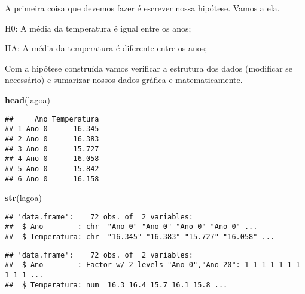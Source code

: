 \documentclass[]{book}
\newenvironment{Shaded}{\begin{snugshade}}{\end{snugshade}}
\newcommand{\KeywordTok}[1]{\textcolor[rgb]{0.13,0.29,0.53}{\textbf{#1}}}
\newcommand{\NormalTok}[1]{#1}
\newcommand{\OperatorTok}[1]{\textcolor[rgb]{0.81,0.36,0.00}{\textbf{#1}}}
\newcommand{\StringTok}[1]{\textcolor[rgb]{0.31,0.60,0.02}{#1}}
\begin{document}
A primeira coisa que devemos fazer é escrever nossa hipótese. Vamos a ela.

H0: A média da temperatura é igual entre os anos;

HA: A média da temperatura é diferente entre os anos;

Com a hipótese construída vamos verificar a estrutura dos dados (modificar se necessário) e sumarizar nossos dados gráfica e matematicamente.

\begin{Shaded}
\begin{Highlighting}[]
\KeywordTok{head}\NormalTok{(lagoa)}
\end{Highlighting}
\end{Shaded}

\begin{verbatim}
##     Ano Temperatura
## 1 Ano 0      16.345
## 2 Ano 0      16.383
## 3 Ano 0      15.727
## 4 Ano 0      16.058
## 5 Ano 0      15.842
## 6 Ano 0      16.158
\end{verbatim}

\begin{Shaded}
\begin{Highlighting}[]
\KeywordTok{str}\NormalTok{(lagoa)}
\end{Highlighting}
\end{Shaded}

\begin{verbatim}
## 'data.frame':    72 obs. of  2 variables:
##  $ Ano        : chr  "Ano 0" "Ano 0" "Ano 0" "Ano 0" ...
##  $ Temperatura: chr  "16.345" "16.383" "15.727" "16.058" ...
\end{verbatim}

\begin{Shaded}
\end{Shaded}

\begin{verbatim}
## 'data.frame':    72 obs. of  2 variables:
##  $ Ano        : Factor w/ 2 levels "Ano 0","Ano 20": 1 1 1 1 1 1 1 1 1 1 ...
##  $ Temperatura: num  16.3 16.4 15.7 16.1 15.8 ...
\end{verbatim}
\end{document}
